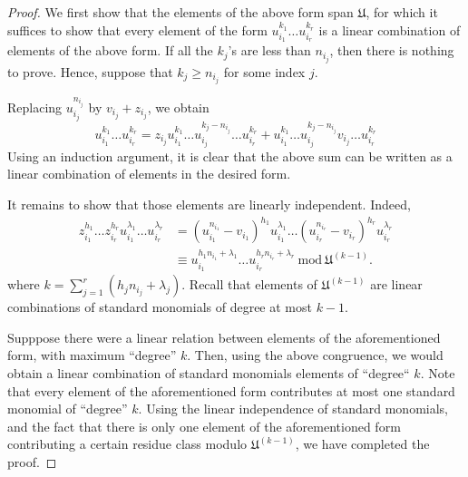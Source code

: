 \documentclass[12pt]{article}
\theoremstyle{thmstyle}
\theoremstyle{defstyle}
\newcommand{\frakU}{\mathfrak{U}}
\renewcommand{\mod}{~\mathrm{mod}~}
\renewcommand{\ge}{\geqslant}
\begin{document}
\begin{proof}
    We first show that the elements of the above form span $\frakU$, for which it suffices to show that every element of the form $u_{i_1}^{k_1}\dots u_{i_r}^{k_r}$ is a linear combination of elements of the above form. If all the $k_j$'s are less than $n_{i_j}$, then there is nothing to prove. Hence, suppose that $k_j\ge n_{i_j}$ for some index $j$.

    Replacing $u_{i_j}^{n_{i_j}}$ by $v_{i_j} + z_{i_j}$, we obtain 
    \begin{equation*}
        u_{i_1}^{k_1}\dots u_{i_r}^{k_r} = z_{i_j}u_{i_1}^{k_1}\dots u_{i_j}^{k_j - n_{i_j}}\dots u_{i_r}^{k_r} + u_{i_1}^{k_1}\dots u_{i_j}^{k_j - n_{i_j}}v_{i_j}\dots u_{i_r}^{k_r}
    \end{equation*}
    Using an induction argument, it is clear that the above sum can be written as a linear combination of elements in the desired form.

    It remains to show that those elements are linearly independent. Indeed, 
    \begin{align*}
        z_{i_1}^{h_1}\dots z_{i_r}^{h_r}u_{i_1}^{\lambda_1}\dots u_{i_r}^{\lambda_r} &= (u_{i_1}^{n_{i_1}} - v_{i_1})^{h_1}u_{i_1}^{\lambda_1}\dots (u_{i_r}^{n_{i_r}} - v_{i_r})^{h_r}u_{i_r}^{\lambda_r}\\
        &\equiv u_{i_1}^{h_1n_{i_1} + \lambda_1}\dots u_{i_r}^{h_rn_{i_r} + \lambda_r}\mod\frakU^{(k - 1)}.
    \end{align*}
    where $k = \displaystyle\sum_{j = 1}^r (h_jn_{i_j} + \lambda_j)$. Recall that elements of $\frakU^{(k - 1)}$ are linear combinations of standard monomials of degree at most $k - 1$.

    Supppose there were a linear relation between elements of the aforementioned form, with maximum ``degree'' $k$. Then, using the above congruence, we would obtain a linear combination of standard monomials elements of ``degree`` $k$. Note that every element of the aforementioned form contributes at most one standard monomial of ``degree'' $k$. Using the linear independence of standard monomials, and the fact that there is only one element of the aforementioned form contributing a certain residue class modulo $\frakU^{(k - 1)}$, we have completed the proof.
\end{proof}
\end{document}
